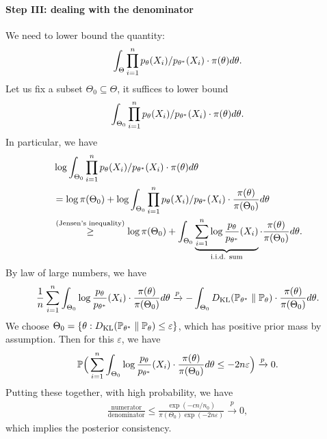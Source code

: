 \documentclass[11pt,letterpaper]{article}
\numberwithin{theorem}{lecture}
\numberwithin{proposition}{lecture}
\numberwithin{lemma}{lecture}
\numberwithin{claim}{lecture}
\numberwithin{corollary}{lecture}
\numberwithin{definition}{lecture}
\numberwithin{conjecture}{lecture}
\numberwithin{remark}{lecture}
\numberwithin{example}{lecture}
\numberwithin{equation}{lecture}
\begin{document}
\paragraph{Step III: dealing with the denominator}
We need to lower bound the quantity:
\begin{align*}
  \int_{\Theta} \prod_{i=1}^n p_\theta (X_i) / p_{{\theta^*}} (X_i) \cdot  \pi (\theta) d\theta.
\end{align*}
Let us fix a subset $\Theta_0 \subseteq \Theta$, it suffices to lower bound
\begin{align*}
  \int_{\Theta_0} \prod_{i=1}^n p_\theta (X_i) / p_{{\theta^*}} (X_i) \cdot  \pi (\theta) d\theta.
\end{align*}
In particular, we have
\begin{align*}
  &\log \int_{\Theta_0} \prod_{i = 1}^n p_\theta (X_i) / p_{{\theta^*}} (X_i) \cdot  \pi (\theta) d\theta\\
  &= \log \pi (\Theta_0) + \log \int_{\Theta_0} \prod_{i = 1}^n p_\theta (X_i) / p_{{\theta^*}} (X_i) \cdot  \frac{\pi (\theta)}{\pi (\Theta_0)} d\theta\\
  &\overset{(\text{Jensen's inequality})}{\geq} \log \pi (\Theta_0) + \int_{\Theta_0} \underbrace{\sum_{i = 1}^n \log \frac{p_\theta}{p_{{\theta^*}}} (X_i)}_{\text{i.i.d. sum}} \cdot  \frac{\pi (\theta)}{\pi (\Theta_0)} d\theta.
\end{align*}
By law of large numbers, we have
\begin{align*}
  \frac{1}{n} \sum_{i = 1}^n \int_{\Theta_0} \log \frac{p_\theta}{p_{{\theta^*}}} (X_i) \cdot  \frac{\pi (\theta)}{\pi (\Theta_0)} d\theta \xrightarrow{p} - \int_{\Theta_0} D_{\text{KL}}({\mathbb{P}}_{{\theta^*}}\; \| \; {\mathbb{P}}_\theta) \cdot  \frac{\pi (\theta)}{\pi (\Theta_0)} d\theta.
\end{align*}
We choose $\Theta_0 = \{\theta: D_{\text{KL}}({\mathbb{P}}_{{\theta^*}}\; \| \; {\mathbb{P}}_\theta) \leq \varepsilon\}$, which has positive prior mass by assumption. Then for this $\varepsilon$, we have
\begin{align*}
  {\mathbb{P}} \Big(\sum_{i = 1}^n \int_{\Theta_0} \log \frac{p_\theta}{p_{{\theta^*}}} (X_i) \cdot  \frac{\pi (\theta)}{\pi (\Theta_0)} d\theta \leq - 2 n \varepsilon  \Big) \xrightarrow{p} 0.
\end{align*}
Putting these together, with high probability, we have
\begin{align*}
  \frac{\mbox{numerator}}{\mbox{denominator}} \leq \frac{\exp ( - c n / n_0)}{\pi (\Theta_0) \exp ( - 2 n \varepsilon)} \xrightarrow{p} 0,
\end{align*}
which implies the posterior consistency.
\end{document}
